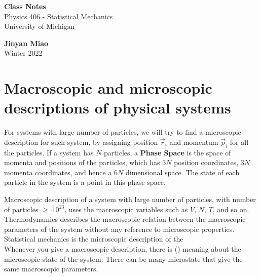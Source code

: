 \documentclass[11pt]{article}
\theoremstyle{break}
\theoremstyle{break}
\newcommand{\ee}[1]{\cdot 10^{#1}}
\begin{document}
	\begin{titlepage}
		\begin{center}
			\vspace*{\fill}
			\Huge \color{red}
				\textbf{Class Notes}\\
			\vspace{0.5cm}			
			\Large \color{black}
				Physics 406 - Statistical Mechanics\\	
				University of Michigan\\
			\vspace{3cm}

			
			\vspace{5cm}
			\LARGE
				\textbf{Jinyan Miao}\\
				Winter 2022\\
			\vspace{5cm}

		\vspace*{\fill}
		\end{center}			
	\end{titlepage}

\newpage
\section{\color{red} Macroscopic and microscopic descriptions of physical systems}

For systems with large number of particles, we will try to find a microscopic description for such system, by assigning position $\vec{r}_i$ and momentum $\vec{p}_i$ for all the particles. If a system has $N$ particles, a \textbf{Phase Space} is the space of momenta and positions  of the particles, which has $3N$ position coordinates, $3N$ momenta coordinates, and hence a $6N$ dimensional space. The state of each particle in the system is a point in this phase space.

Macroscopic description of a system with large number of particles, with number of particles $\geq \ee{23}$, uses the macroscopic variables such as $V$, $N$, $T$, and so on. Thermodynamics describes the macroscopic relation between the macroscopic parameters of the system without any reference to microscopic properties.\\

Statistical mechanics is the microscopic description of the \\

Whenever you give a macroscopic description, there is () meaning about the microscopic state of the system. There can be many microstate that give the same macroscopic parameters.\\
\end{document}
